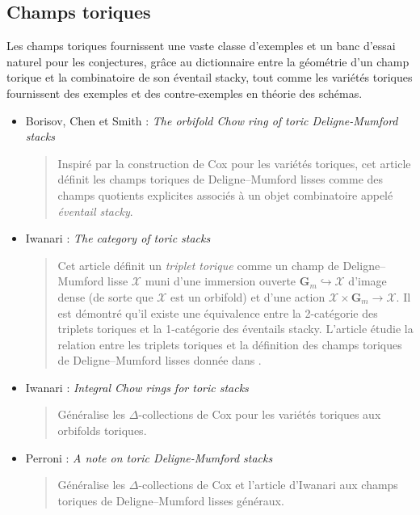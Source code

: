 \subsection{Champs toriques}
\label{subsection-toric}

\noindent
Les champs toriques fournissent une vaste classe d'exemples et un banc d'essai
naturel pour les conjectures, grâce au dictionnaire entre la géométrie d'un
champ torique et la combinatoire de son éventail stacky, tout comme les
variétés toriques fournissent des exemples et des contre-exemples en théorie
des schémas.
\begin{itemize}
\item Borisov, Chen et Smith : \emph{The orbifold Chow ring of toric
Deligne-Mumford stacks} \cite{bcs}
\begin{quote}
Inspiré par la construction de Cox pour les variétés toriques, cet article
définit les champs toriques de Deligne--Mumford lisses comme des champs
quotients explicites associés à un objet combinatoire appelé
\emph{éventail stacky}.
\end{quote}
\item Iwanari : \emph{The category of toric stacks} \cite{iwanari_toric}
\begin{quote}
Cet article définit un \emph{triplet torique} comme un champ de
Deligne--Mumford lisse $\mathcal{X}$ muni d'une immersion ouverte
$\mathbf{G}_m \hookrightarrow \mathcal{X}$ d'image dense (de sorte que
$\mathcal{X}$ est un orbifold) et d'une action
$\mathcal{X} \times \mathbf{G}_m \rightarrow \mathcal{X}$. Il est démontré
qu'il existe une équivalence entre la 2-catégorie des triplets toriques et la
1-catégorie des éventails stacky. L'article étudie la relation entre les
triplets toriques et la définition des champs toriques de Deligne--Mumford
lisses donnée dans \cite{bcs}.
\end{quote}
\item Iwanari : \emph{Integral Chow rings for toric stacks}
\cite{iwanari_chow}
\begin{quote}
Généralise les $\Delta$-collections de Cox pour les variétés toriques aux
orbifolds toriques.
\end{quote}
\item Perroni : \emph{A note on toric Deligne-Mumford stacks}
\cite{perroni}
\begin{quote}
Généralise les $\Delta$-collections de Cox et l'article d'Iwanari
\cite{iwanari_chow} aux champs toriques de Deligne--Mumford lisses généraux.
\end{quote}

\end{itemize}
